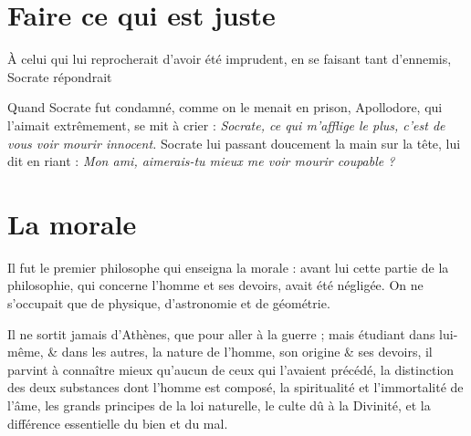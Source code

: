 \documentclass[fontsize=28pt,a4paper]{scrartcl}
\begin{document}


\clearpage

\section{Faire ce qui est juste}

À celui qui lui reprocherait d'avoir été imprudent, en se faisant tant d'ennemis, Socrate répondrait 

Quand Socrate fut condamné, comme on le menait en prison, Apollodore, qui l'aimait extrêmement, se mit à crier : \textit{Socrate, ce qui m'afflige le plus, c'est de vous voir mourir innocent.} Socrate lui passant doucement la main sur la tête, lui dit en riant : \textit{Mon ami, aimerais-tu mieux me voir mourir coupable ?}

\clearpage

\section{La morale}

Il fut le premier philosophe qui enseigna la morale : avant lui cette partie de la philosophie, qui concerne l'homme et ses devoirs, avait été négligée. On ne s'occupait que de physique, d'astronomie et de géométrie.

Il ne sortit jamais d'Athènes, que pour aller à la guerre ; mais étudiant dans lui-même, \& dans les autres, la nature de l'homme, son origine \& ses devoirs, il parvint à connaître mieux qu'aucun de ceux qui l'avaient précédé, la distinction des deux substances dont l'homme est composé, la spiritualité et l'immortalité de l'âme, les grands principes de la loi naturelle, le culte dû à la Divinité, et la différence essentielle du bien et du mal.
\end{document}
